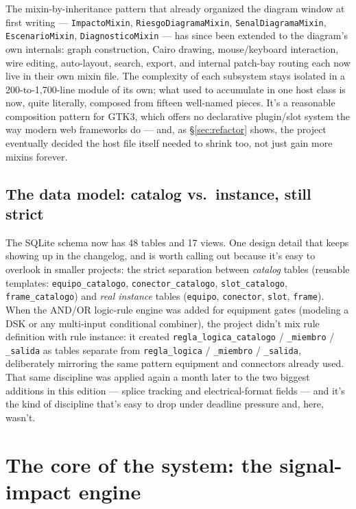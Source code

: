 \documentclass[10.4pt,twocolumn]{article}
\begin{document}
The mixin-by-inheritance pattern that already organized the diagram window at first writing --- \texttt{ImpactoMixin}, \texttt{RiesgoDiagramaMixin}, \texttt{SenalDiagramaMixin}, \texttt{EscenarioMixin}, \texttt{DiagnosticoMixin} --- has since been extended to the diagram's own internals: graph construction, Cairo drawing, mouse/keyboard interaction, wire editing, auto-layout, search, export, and internal patch-bay routing each now live in their own mixin file. The complexity of each subsystem stays isolated in a 200-to-1{,}700-line module of its own; what used to accumulate in one host class is now, quite literally, composed from fifteen well-named pieces. It's a reasonable composition pattern for GTK3, which offers no declarative plugin/slot system the way modern web frameworks do --- and, as \S\ref{sec:refactor} shows, the project eventually decided the host file itself needed to shrink too, not just gain more mixins forever.

\subsection{The data model: catalog vs.\ instance, still strict}

The SQLite schema now has 48 tables and 17 views. One design detail that keeps showing up in the changelog, and is worth calling out because it's easy to overlook in smaller projects: the strict separation between \emph{catalog} tables (reusable templates: \texttt{equipo\_catalogo}, \texttt{conector\_catalogo}, \texttt{slot\_catalogo}, \texttt{frame\_catalogo}) and \emph{real instance} tables (\texttt{equipo}, \texttt{conector}, \texttt{slot}, \texttt{frame}). When the AND/OR logic-rule engine was added for equipment gates (modeling a DSK or any multi-input conditional combiner), the project didn't mix rule definition with rule instance: it created \texttt{regla\_logica\_catalogo} / \texttt{\_miembro} / \texttt{\_salida} as tables separate from \texttt{regla\_logica} / \texttt{\_miembro} / \texttt{\_salida}, deliberately mirroring the same pattern equipment and connectors already used. That same discipline was applied again a month later to the two biggest additions in this edition --- splice tracking and electrical-format fields --- and it's the kind of discipline that's easy to drop under deadline pressure and, here, wasn't.

\section{The core of the system: the signal-impact engine}
\end{document}
